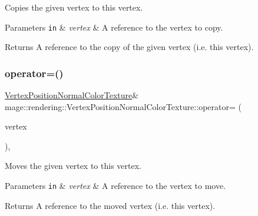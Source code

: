Copies the given vertex to this vertex.


\begin{DoxyParams}[1]{Parameters}
\mbox{\tt in}  & {\em vertex} & A reference to the vertex to copy. \\
\hline
\end{DoxyParams}
\begin{DoxyReturn}{Returns}
A reference to the copy of the given vertex (i.\+e. this vertex). 
\end{DoxyReturn}
\mbox{\label{structmage_1_1rendering_1_1_vertex_position_normal_color_texture_a0f58dc339305a1cc48845824b688b749}} 
\subsubsection{\texorpdfstring{operator=()}{operator=()}\hspace{0.1cm}{\footnotesize\ttfamily [2/2]}}
{\footnotesize\ttfamily \mbox{\hyperlink{structmage_1_1rendering_1_1_vertex_position_normal_color_texture}{Vertex\+Position\+Normal\+Color\+Texture}}\& mage\+::rendering\+::\+Vertex\+Position\+Normal\+Color\+Texture\+::operator= (\begin{DoxyParamCaption}\item[{\mbox{\hyperlink{structmage_1_1rendering_1_1_vertex_position_normal_color_texture}{Vertex\+Position\+Normal\+Color\+Texture}} \&\&}]{vertex }\end{DoxyParamCaption})\hspace{0.3cm}{\ttfamily [default]}, {\ttfamily [noexcept]}}

Moves the given vertex to this vertex.


\begin{DoxyParams}[1]{Parameters}
\mbox{\tt in}  & {\em vertex} & A reference to the vertex to move. \\
\hline
\end{DoxyParams}
\begin{DoxyReturn}{Returns}
A reference to the moved vertex (i.\+e. this vertex). 
\end{DoxyReturn}


